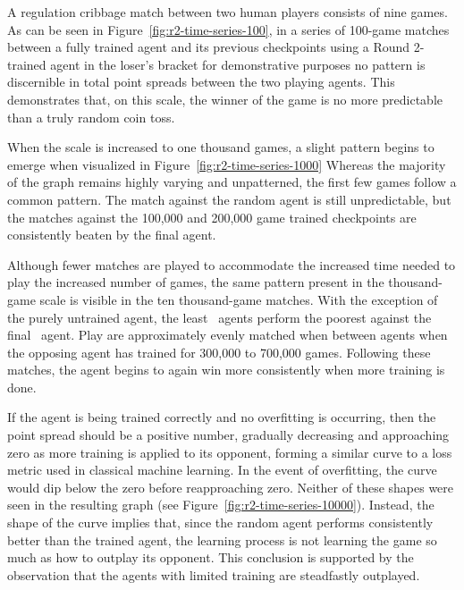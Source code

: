 A regulation cribbage match between two human players consists of nine games.
%
As can be seen in Figure~\ref{fig:r2-time-series-100},
in a series of 100-game matches between a fully trained agent and its
previous checkpoints\textemdash
using a Round 2-trained agent in the loser's bracket for demonstrative
purposes\textemdash
no pattern is discernible in total point spreads between the two playing agents.
%
This demonstrates that,
on this scale,
the winner of the game is no more predictable than a truly random coin toss.

When the scale is increased to one thousand games,
a slight pattern begins to emerge
when visualized in Figure~\ref{fig:r2-time-series-1000}
%
Whereas the majority of the graph remains highly varying and unpatterned,
the first few games follow a common pattern.
%
The match against the random agent is still unpredictable,
but the matches against the 100,000 and 200,000 game trained checkpoints are
consistently beaten by the final agent.

Although fewer matches are played to accommodate the increased time needed to
play the increased number of games,
the same pattern present in the thousand-game scale is visible in the
ten thousand-game matches.
%
With the exception of the purely untrained agent,
the least \learned\ agents perform the poorest against the final
\learned\ agent.
%
Play are approximately evenly matched when between agents
when the opposing agent has trained for 300,000 to 700,000 games.
%
Following these matches,
the agent begins to again win more consistently when more training is done.

If the agent is being trained correctly and no overfitting is occurring,
then the point spread should be a positive number,
gradually decreasing and approaching zero
as more training is applied to its opponent,
forming a similar curve to a loss metric used in classical machine learning.
%
In the event of overfitting,
the curve would dip below the zero before reapproaching zero.
%
Neither of these shapes were seen in the resulting graph
(see Figure~\ref{fig:r2-time-series-10000}).
%
Instead,
the shape of the curve implies that,
since the random agent performs consistently better than the trained agent,
the learning process is not learning the game so much as how to outplay its
opponent.
%
This conclusion is supported by the observation that the agents with limited
training are steadfastly outplayed.

